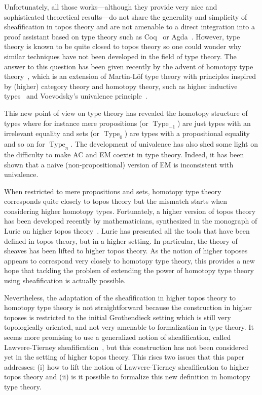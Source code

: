 \documentclass[conference]{IEEEtran}
\DeclareMathOperator{\Type}{Type}
\begin{document}
Unfortunately, all those works---although they provide very nice and
sophisticated theoretical results---do not share the generality and
simplicity of sheafification in topos theory and are not amenable to a
direct integration into a proof assistant based on type theory such as
Coq~\cite{coq:refman:8.4} or Agda~\cite{norell2007towards}.  
%
However, type theory is known to be quite closed to topos theory so
one could wonder why similar techniques have not been developed in the
field of type theory. 
%
The answer to this question has been given recently by the advent of
homotopy type theory~\cite{hottbook}, which is an extension of
Martin-Löf type theory with principles inspired by (higher) category
theory and homotopy theory, such as higher inductive
types~\cite{lumsdaine2011higher,lumsdaine2013higher} and
Voevodsky's univalence principle~\cite{kapulkin2012simplicial}. 
%

This new point of view on type theory has revealed the homotopy
structure of types where for instance mere propositions (or
$\Type_{-1}$) are just types with an
irrelevant equality and sets (or $\Type_{0}$) are types
with a propositional equality and so on for $\Type_{n}$.
%
The development of univalence has also shed some light on the
difficulty to make AC and EM coexist in type theory. Indeed, it
has been shown that a naive (non-propositional) version of EM is
inconsistent with univalence.

When restricted to mere propositions and sets, homotopy type
theory corresponds quite closely to topos theory but the mismatch
starts when considering higher homotopy types.
%
Fortunately, a higher version of topos theory has been developed
recently by mathematicians, synthesized in the monograph of Lurie on
higher topos theory~\cite{lurie}. 
%
Lurie has presented all the tools that have been defined in
topos theory, but in a higher setting. In particular, the theory of
sheaves has been lifted to higher topos theory.
%
As the notion of higher toposes appears to correspond very closely to
homotopy type theory, this provides a new hope that tackling the
problem of extending the power of homotopy type theory using
sheafification is actually possible.

Nevertheless, the adaptation of the sheafification in higher topos
theory to homotopy type theory is not straightforward because the
construction in higher toposes is restricted to the initial Grothendieck
setting which is still very topologically oriented, and not very
amenable to formalization in type theory. It seems more promising to
use a generalized notion of sheafification, called Lawvere-Tierney
sheafification~\cite{tierney1972sheaf,maclanemoerdijk}, but this construction has not
been considered yet in the setting of higher topos theory. This rises
two issues that this paper addresses: (i) how to lift the notion of
Lawvere-Tierney sheafification to higher topos theory and (ii) is it
possible to formalize this new definition in homotopy type theory.
\end{document}
